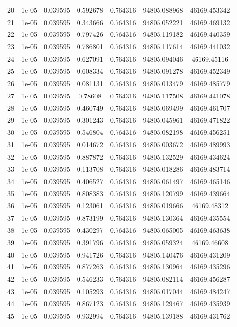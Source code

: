 \begin{table}
\begin{tabular*}{\linewidth}{c|c|c|c|c|c|c}
20 & 1e-05 & 0.039595 & 0.592678 & 0.764316 & 94805.088968 & 46169.453342\\
21 & 1e-05 & 0.039595 & 0.343666 & 0.764316 & 94805.052221 & 46169.469132\\
22 & 1e-05 & 0.039595 & 0.797426 & 0.764316 & 94805.119182 & 46169.440359\\
23 & 1e-05 & 0.039595 & 0.786801 & 0.764316 & 94805.117614 & 46169.441032\\
24 & 1e-05 & 0.039595 & 0.627091 & 0.764316 & 94805.094046 & 46169.45116\\
25 & 1e-05 & 0.039595 & 0.608334 & 0.764316 & 94805.091278 & 46169.452349\\
26 & 1e-05 & 0.039595 & 0.081131 & 0.764316 & 94805.013479 & 46169.485779\\
27 & 1e-05 & 0.039595 & 0.78608 & 0.764316 & 94805.117508 & 46169.441078\\
28 & 1e-05 & 0.039595 & 0.460749 & 0.764316 & 94805.069499 & 46169.461707\\
29 & 1e-05 & 0.039595 & 0.301243 & 0.764316 & 94805.045961 & 46169.471822\\
30 & 1e-05 & 0.039595 & 0.546804 & 0.764316 & 94805.082198 & 46169.456251\\
31 & 1e-05 & 0.039595 & 0.014672 & 0.764316 & 94805.003672 & 46169.489993\\
32 & 1e-05 & 0.039595 & 0.887872 & 0.764316 & 94805.132529 & 46169.434624\\
33 & 1e-05 & 0.039595 & 0.113708 & 0.764316 & 94805.018286 & 46169.483714\\
34 & 1e-05 & 0.039595 & 0.406527 & 0.764316 & 94805.061497 & 46169.465146\\
35 & 1e-05 & 0.039595 & 0.808383 & 0.764316 & 94805.120799 & 46169.439664\\
36 & 1e-05 & 0.039595 & 0.123061 & 0.764316 & 94805.019666 & 46169.48312\\
37 & 1e-05 & 0.039595 & 0.873199 & 0.764316 & 94805.130364 & 46169.435554\\
38 & 1e-05 & 0.039595 & 0.430297 & 0.764316 & 94805.065005 & 46169.463638\\
39 & 1e-05 & 0.039595 & 0.391796 & 0.764316 & 94805.059324 & 46169.46608\\
40 & 1e-05 & 0.039595 & 0.941726 & 0.764316 & 94805.140476 & 46169.431209\\
41 & 1e-05 & 0.039595 & 0.877263 & 0.764316 & 94805.130964 & 46169.435296\\
42 & 1e-05 & 0.039595 & 0.546233 & 0.764316 & 94805.082114 & 46169.456287\\
43 & 1e-05 & 0.039595 & 0.105293 & 0.764316 & 94805.017044 & 46169.484247\\
44 & 1e-05 & 0.039595 & 0.867123 & 0.764316 & 94805.129467 & 46169.435939\\
45 & 1e-05 & 0.039595 & 0.932994 & 0.764316 & 94805.139188 & 46169.431762\\
\end{tabular*}
\end{table}
